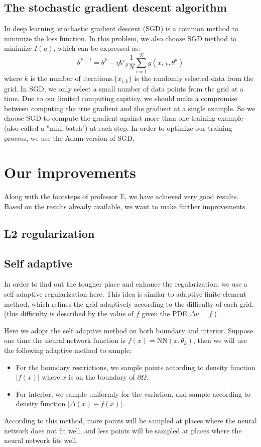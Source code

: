 \documentclass{article}
\begin{document}
 \subsection{The stochastic gradient descent algorithm}
 In deep learning, stochastic gradient descent (SGD) is a common method to minimize the loss function. In this problem, we also choose SGD method to minimize $I(u)$, which can be expressed as:
 \begin{equation}
 \theta^{k+1}=\theta^{k}-\eta \nabla_{\theta}\frac{1}{N}\sum\limits_{i=1}^{N}g(x_{i,k},\theta^k)
 \end{equation}
 where $k$ is the number of iterations.$\{x_{i,k}\}$ is the randomly selected data from the grid. In SGD, we only select a small number of data points from the grid at a time. Due to our limited computing capiticy, we should make a compromise  between computing the true gradient and the gradient at a single example. So we choose SGD to compute the gradient against more than one training example (also called a "mini-batch") at each step. In order to optimize our training process, we use the Adam version of SGD.


\section{Our improvements}
\par Along with the footsteps of professor E, we have achieved very good results. Based on the results already available, we want to make further improvements. 

\subsection{L2 regularization}

\subsection{Self adaptive}
\par In order to find out the tougher place and enhance the regularization, we use a self-adaptive regularization here. This idea is similar to adaptive finite element method, which refines the grid adaptively according to the difficulty of each grid. (this difficulty is described by the value of $f$ given the PDE $\Delta u = f$.) 
\par Here we adopt the self adaptive method on both boundary and interior. Suppose one time the neural network function is $f(x) = \mathrm{NN}(x, \theta_k)$, then we will use the following adaptive method to sample:
\begin{itemize}
	\item For the boundary restrictions, we sample points according to density function $|f(x)|$ where $x$ is on the boundary of $\partial\Omega$.
	\item For interior, we sample uniformly for the variation, and sample according to density function $|\Delta(x) - f(x)|$.
\end{itemize}
\par  According to this method, more points will be sampled at places where the neural network does not fit well, and less points will be sampled at places where the neural network fits well. 
\end{document}
